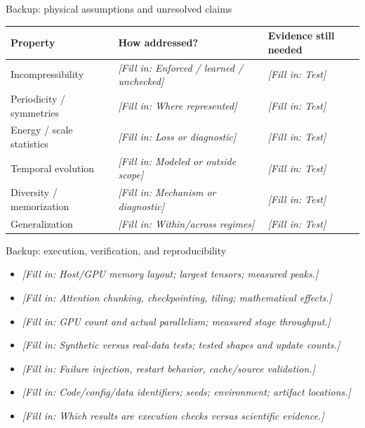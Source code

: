 \documentclass[aspectratio=169,11pt]{beamer}
\newcommand{\fillin}[1]{{\color{prompt}\textit{[Fill in: #1]}}}
\begin{document}
\begin{frame}{Backup: physical assumptions and unresolved claims}
  \small
  \begin{tabularx}{\linewidth}{XXX}
    \toprule
    Property & How addressed? & Evidence still needed \\
    \midrule
    Incompressibility & \fillin{Enforced / learned / unchecked} & \fillin{Test} \\
    Periodicity / symmetries & \fillin{Where represented} & \fillin{Test} \\
    Energy / scale statistics & \fillin{Loss or diagnostic} & \fillin{Test} \\
    Temporal evolution & \fillin{Modeled or outside scope} & \fillin{Test} \\
    Diversity / memorization & \fillin{Mechanism or diagnostic} & \fillin{Test} \\
    Generalization & \fillin{Within/across regimes} & \fillin{Test} \\
    \bottomrule
  \end{tabularx}
\end{frame}

\begin{frame}{Backup: execution, verification, and reproducibility}
  \begin{itemize}
    \item \fillin{Host/GPU memory layout; largest tensors; measured peaks.}
    \item \fillin{Attention chunking, checkpointing, tiling; mathematical effects.}
    \item \fillin{GPU count and actual parallelism; measured stage throughput.}
    \item \fillin{Synthetic versus real-data tests; tested shapes and update counts.}
    \item \fillin{Failure injection, restart behavior, cache/source validation.}
    \item \fillin{Code/config/data identifiers; seeds; environment; artifact locations.}
    \item \fillin{Which results are execution checks versus scientific evidence.}
  \end{itemize}
\end{frame}
\end{document}
